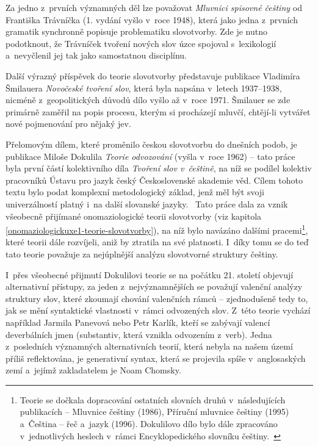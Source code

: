 Za jedno z~prvních významných děl lze považovat \emph{Mluvnici spisovné
češtiny} od Františka Trávníčka (1. vydání vyšlo v~roce 1948), která
jako jedna z~prvních gramatik synchronně popisuje problematiku
slovotvorby. Zde je nutno podotknout, že Trávníček tvoření nových slov
úzce spojoval s~lexikologií a~nevyčlenil jej tak jako samostatnou
disciplínu.~\parencite[263]{rousinova07}

Další výrazný příspěvek do teorie slovotvorby představuje publikace
Vladimíra Šmilauera \emph{Novočeské tvoření slov}, která byla napsána
v~letech 1937--1938, nicméně z~geopolitických důvodů dílo vyšlo až v~roce
1971. Šmilauer se zde primárně zaměřil na popis procesu, kterým si
procházejí mluvčí, chtějí-li vytvářet nové pojmenování pro nějaký jev.
\parencite[265]{rousinova07}

Přelomovým dílem, které proměnilo českou slovotvorbu do dnešních podob,
je publikace Miloše Dokulila \emph{Teorie odvozování} (vyšla v~roce
1962) -- tato práce byla první částí kolektivního díla \emph{Tvoření
slov v~češtině}, na níž se podílel kolektiv pracovníků Ústavu pro jazyk
český Československé akademie věd. Cílem tohoto textu bylo podat
komplexní metodologický základ, jenž měl být svoji univerzálností platný
i~na další slovanské jazyky.~\parencite[267]{rousinova07} Tato práce
dala za vznik všeobecně přijímané onomaziologické teorii slovotvorby
(viz kapitola \ref{onomaziologickuxe1-teorie-slovotvorby}), na níž bylo
navázáno dalšími
pracemi\footnote{Teorie se dočkala dopracování ostatních slovních druhů v~následujících publikacích -- Mluvnice češtiny (1986), Příruční mluvnice češtiny (1995) a~Čeština -- řeč a~jazyk (1996). Dokulilovo dílo bylo dále zpracováno v~jednotlivých heslech v~rámci Encyklopedického slovníku češtiny.~\parencite[272]{rousinova07}},
které teorii dále rozvíjeli, aniž by ztratila na své platnosti.
\parencite[272]{rousinova07} I~díky tomu se do teď tato teorie považuje
za nejúplnější analýzu slovotvorné struktury češtiny.
\parencite[273]{zikova07}

I~přes všeobecné přijmutí Dokulilovi teorie se na počátku 21. století
objevují alternativní přístupy, za jeden z~nejvýznamnějších se považují
valenční analýzy struktury slov, které zkoumají chování valenčních rámců
-- zjednodušeně tedy to, jak se mění syntaktické vlastnosti v~rámci
odvozených slov. Z~této teorie vychází například Jarmila Panevová nebo
Petr Karlík, kteří se zabývají valencí deverbálních jmen (substantiv,
která vznikla odvozením z~verb). Jedna z~posledních významných
alternativních teorií, která nebyla na našem území příliš reflektována,
je generativní syntax, která se projevila spíše v~anglosaských zemí
a~jejímž zakladatelem je Noam Chomsky.~\parencite[274--275]{zikova07}

